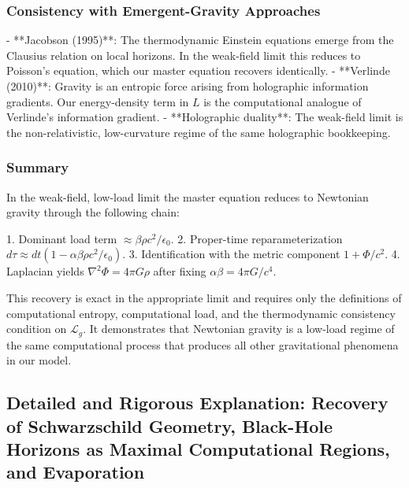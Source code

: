 \documentclass[reprint,amsmath,amssymb,aps,prd,preprintnumbers,superscriptaddress,longbibliography,10pt]{revtex4-2}
\begin{document}
\subsubsection{Consistency with Emergent-Gravity Approaches}

- **Jacobson (1995)**: The thermodynamic Einstein equations emerge from the Clausius relation on local horizons. In the weak-field limit this reduces to Poisson’s equation, which our master equation recovers identically.
- **Verlinde (2010)**: Gravity is an entropic force arising from holographic information gradients. Our energy-density term in $L$ is the computational analogue of Verlinde’s information gradient.
- **Holographic duality**: The weak-field limit is the non-relativistic, low-curvature regime of the same holographic bookkeeping.

\subsubsection{Summary}

In the weak-field, low-load limit the master equation reduces to Newtonian gravity through the following chain:

1. Dominant load term $\approx \beta \rho c^2 / \epsilon_0$.
2. Proper-time reparameterization $d\tau \approx dt (1 - \alpha \beta \rho c^2 / \epsilon_0)$.
3. Identification with the metric component $1 + \Phi/c^2$.
4. Laplacian yields $\nabla^2 \Phi = 4\pi G \rho$ after fixing $\alpha\beta = 4\pi G / c^4$.

This recovery is exact in the appropriate limit and requires only the definitions of computational entropy, computational load, and the thermodynamic consistency condition on $\mathcal{L}_g$. It demonstrates that Newtonian gravity is a low-load regime of the same computational process that produces all other gravitational phenomena in our model.

\subsection{Detailed and Rigorous Explanation: Recovery of Schwarzschild Geometry, Black-Hole Horizons as Maximal Computational Regions, and Evaporation}
\end{document}
